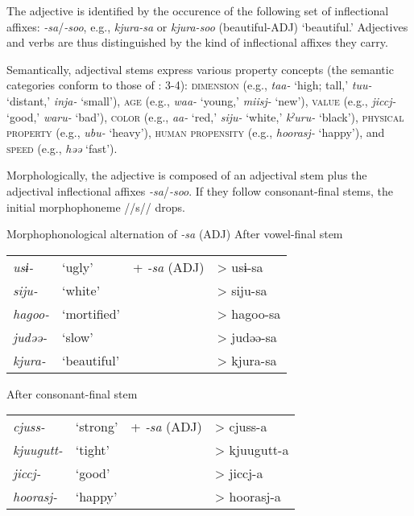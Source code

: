 The adjective is identified by the occurence of the following set of inflectional affixes: \textit{{}-sa}/\textit{{}-soo}, e.g., \textit{kjura-sa} or \textit{kjura-soo} (beautiful-ADJ) ‘beautiful.’ Adjectives and verbs are thus distinguished by the kind of inflectional affixes they carry.

Semantically, adjectival stems express various property concepts (the semantic categories conform to those of \citealt{Dixon2004}: 3-4): \textsc{dimension} (e.g., \textit{taa-} ‘high; tall,’ \textit{tuu-} ‘distant,’ \textit{inja-} ‘small’), \textsc{age} (e.g., \textit{waa-} ‘young,’ \textit{miisj-} ‘new’), \textsc{value} (e.g., \textit{jiccj-} ‘good,’ \textit{waru-} ‘bad’), \textsc{color} (e.g., \textit{aa-} ‘red,’ \textit{siju-} ‘white,’ \textit{kˀuru-} ‘black’), \textsc{physical} \textsc{property} (e.g., \textit{ubu-} ‘heavy’), \textsc{human} \textsc{propensity} (e.g., \textit{hoorasj-} ‘happy’), and \textsc{speed} (e.g., \textit{həə} ‘fast’).

Morphologically, the adjective is composed of an adjectival stem plus the adjectival inflectional affixes \textit{{}-sa}/\textit{{}-soo}. If they follow consonant-final stems, the initial morphophoneme //s// drops.

\ea  Morphophonological alternation of \textit{{}-sa} (ADJ) \label{ex:4.49}
  \ea After vowel-final stem\\
\begin{tabular}{@{}llll@{}}
    \textit{usɨ-}   & ‘ugly’        & +  \textit{{}-sa} (ADJ) & >  usɨ-sa  \\
    \textit{siju-}  & ‘white’       &                         & >  siju-sa \\
    \textit{hagoo-} &  ‘mortified’  &                         & >  hagoo-sa\\
    \textit{judəə-} &  ‘slow’       &                         & >  judəə-sa\\
    \textit{kjura-} &  ‘beautiful’  &                         & >  kjura-sa\\
\end{tabular}
\ex After consonant-final stem\\
\begin{tabular}{@{}llll@{}}
    \textit{cjuss-}    & ‘strong’ & +  \textit{{}-sa} (ADJ) & >  cjuss-a   \\
    \textit{kjuugutt-} & ‘tight’  &                         & >  kjuugutt-a\\
    \textit{jiccj-}    & ‘good’   &                         & >  jiccj-a   \\
    \textit{hoorasj-}  & ‘happy’  &                         & >  hoorasj-a \\
\end{tabular}
\z
\z

